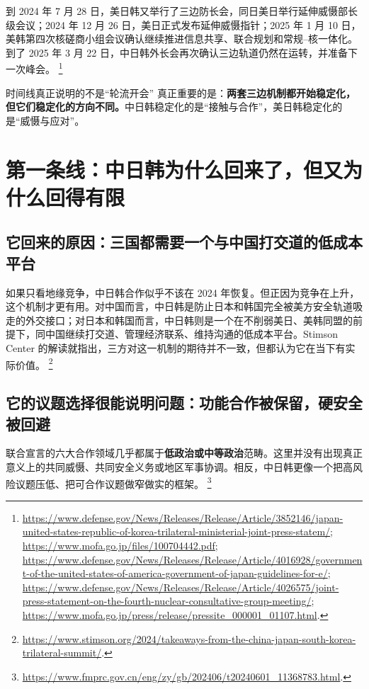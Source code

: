 \documentclass[a4paper]{article}
\begin{document}
到 2024 年 7 月 28 日，美日韩又举行了三边防长会，同日美日举行延伸威慑部长级会议；2024 年 12 月 26 日，美日正式发布延伸威慑指针；2025 年 1 月 10 日，美韩第四次核磋商小组会议确认继续推进信息共享、联合规划和常规--核一体化。到了 2025 年 3 月 22 日，中日韩外长会再次确认三边轨道仍然在运转，并准备下一次峰会。%
\footnote{\url{https://www.defense.gov/News/Releases/Release/Article/3852146/japan-united-states-republic-of-korea-trilateral-ministerial-joint-press-statem/}; \url{https://www.mofa.go.jp/files/100704442.pdf}; \url{https://www.defense.gov/News/Releases/Release/Article/4016928/government-of-the-united-states-of-america-government-of-japan-guidelines-for-e/}; \url{https://www.defense.gov/News/Releases/Release/Article/4026575/joint-press-statement-on-the-fourth-nuclear-consultative-group-meeting/}; \url{https://www.mofa.go.jp/press/release/pressite_000001_01107.html}.}

\begin{findingbox}{时间线真正说明的不是“轮流开会”}
真正重要的是：\textbf{两套三边机制都开始稳定化，但它们稳定化的方向不同。}中日韩稳定化的是“接触与合作”，美日韩稳定化的是“威慑与应对”。
\end{findingbox}

\section{第一条线：中日韩为什么回来了，但又为什么回得有限}

\subsection{它回来的原因：三国都需要一个与中国打交道的低成本平台}

如果只看地缘竞争，中日韩合作似乎不该在 2024 年恢复。但正因为竞争在上升，这个机制才更有用。对中国而言，中日韩是防止日本和韩国完全被美方安全轨道吸走的外交接口；对日本和韩国而言，中日韩则是一个在不削弱美日、美韩同盟的前提下，同中国继续打交道、管理经济联系、维持沟通的低成本平台。Stimson Center 的解读就指出，三方对这一机制的期待并不一致，但都认为它在当下有实际价值。%
\footnote{\url{https://www.stimson.org/2024/takeaways-from-the-china-japan-south-korea-trilateral-summit/}.}

\subsection{它的议题选择很能说明问题：功能合作被保留，硬安全被回避}

联合宣言的六大合作领域几乎都属于\textbf{低政治或中等政治}范畴。这里并没有出现真正意义上的共同威慑、共同安全义务或地区军事协调。相反，中日韩更像一个把高风险议题压低、把可合作议题做窄做实的框架。%
\footnote{\url{https://www.fmprc.gov.cn/eng/zy/gb/202406/t20240601_11368783.html}.}
\end{document}
